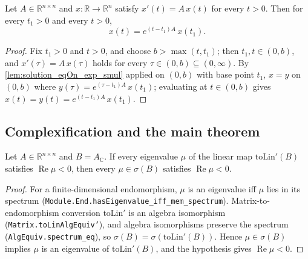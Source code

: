 \begin{lemma}
    \label{lem:solution_eq_exp_smul}
    \leanok
    Let $A \in \mathbb{R}^{n \times n}$ and $x \colon \mathbb{R} \to \mathbb{R}^{n}$
    satisfy $x'(t) = A\,x(t)$ for every $t > 0$. Then for every $t_1 > 0$ and
    every $t > 0$,
    \[ x(t) = e^{(t - t_1)A}\, x(t_1). \]
\end{lemma}
\begin{proof}
    Fix $t_1 > 0$ and $t > 0$, and choose $b > \max(t, t_1)$; then $t_1, t \in
    (0, b)$, and $x'(\tau) = A\,x(\tau)$ holds for every $\tau \in (0,b) \subseteq
    (0,\infty)$. By \cref{lem:solution_eqOn_exp_smul} applied on $(0,b)$ with base
    point $t_1$, $x = y$ on $(0,b)$ where $y(\tau) = e^{(\tau - t_1)A}\, x(t_1)$;
    evaluating at $t \in (0,b)$ gives $x(t) = y(t) = e^{(t - t_1)A}\, x(t_1)$.
\end{proof}

\subsection{Complexification and the main theorem}

\begin{lemma}
    \label{lem:eigenvalue_re_neg_spectrum}
    \leanok
    Let $A \in \mathbb{R}^{n \times n}$ and $B = A_{\mathbb{C}}$. If every
    eigenvalue $\mu$ of the linear map $\mathrm{toLin}'(B)$ satisfies
    $\operatorname{Re}\mu < 0$, then every $\mu \in \sigma(B)$ satisfies
    $\operatorname{Re}\mu < 0$.
\end{lemma}
\begin{proof}
    For a finite-dimensional endomorphism, $\mu$ is an eigenvalue iff $\mu$ lies
    in its spectrum (\texttt{Module.End.hasEigenvalue\_iff\_mem\_spectrum}).
    Matrix-to-endomorphism conversion $\mathrm{toLin}'$ is an algebra
    isomorphism (\texttt{Matrix.toLinAlgEquiv'}), and algebra isomorphisms
    preserve the spectrum (\texttt{AlgEquiv.spectrum\_eq}), so $\sigma(B) =
    \sigma(\mathrm{toLin}'(B))$. Hence $\mu \in \sigma(B)$ implies $\mu$ is an
    eigenvalue of $\mathrm{toLin}'(B)$, and the hypothesis gives
    $\operatorname{Re}\mu < 0$.
\end{proof}

